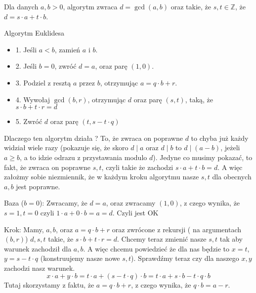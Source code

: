 Dla danych $a,b > 0$, algorytm zwraca $d = \gcd(a,b)$ oraz takie, że $s,t \in \mathbb{Z}$, że $d = s\cdot a + t\cdot b$. 
\newline

Algorytm Euklidesa
\begin{itemize}
    \item 1. Jeśli $a < b$, zamień $a$ i $b$.

    \item 2. Jeśli $b = 0$, zwróć $d = a$, oraz parę $(1,0)$.
    \item 3. Podziel z resztą $a$ przez $b$, otrzymując $a = q \cdot b + r$.
    \item 4. Wywołaj $\gcd(b,r)$, otrzymując $d$ oraz parę $(s,t)$, taką, że $s\cdot b + t\cdot r = d$
    \item 5. Zwróć $d$ oraz parę $(t,s - t \cdot q)$
\end{itemize}

Dlaczego ten algorytm działa ? \newline
To, że zwraca on poprawne $d$ to chyba już każdy widział wiele razy (pokazuje się, że skoro $d \mid a$ oraz $d \mid b$ to $d \mid (a - b)$, jeżeli $a \geq b$, a to idzie odrazu z przystawania modulo $d$). Jedyne co musimy pokazać, to fakt, że zwraca on poprawne $s,t$, czyli takie że zachodzi $s\cdot a + t \cdot b = d$. A więc założmy sobie niezmiennik, że w każdym kroku algorytmu nasze $s,t$ dla obecnych $a,b$ jest poprawne.\newline \newline

Baza ($b = 0$):\newline
Zwracamy, że $d = a$, oraz zwracamy $(1,0)$, z czego wynika, że $s = 1, t = 0$ czyli $1\cdot a + 0 \cdot b = a = d$. Czyli jest OK
\newline
\newline

Krok: \newline
Mamy, $a,b$, oraz $a = q\cdot b + r$ oraz zwrócone z rekursji ( na argumentach $(b,r)$) $d,s,t$ takie, że $s\cdot b + t\cdot r = d$. Chcemy teraz zmienić nasze $s,t$ tak aby warunek zachodził dla $a,b$. A więc chcemu powiedzieć że dla nas będzie to $x = t$, $y = s - t \cdot q$ (konstruujemy nasze nowe $s,t$). Sprawdźmy teraz czy dla naszego $x,y$ zachodzi nasz warunek. $$x\cdot a + y \cdot b = t \cdot a + (s - t\cdot q) \cdot b = t \cdot a + s \cdot b - t \cdot q \cdot b$$
Tutaj skorzystamy z faktu, że $a = q\cdot b + r$, z czego wynika, że $q\cdot b = a - r$.

